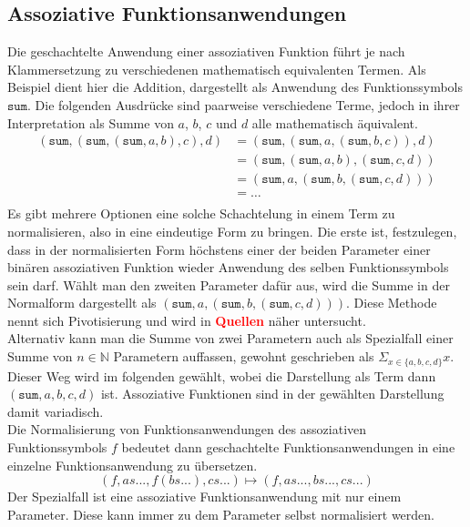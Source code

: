 \documentclass{scrartcl}
\numberwithin{figure}{section} %
\theoremstyle{definition} %
\begin{document}
\subsection {Assoziative Funktionsanwendungen}
Die geschachtelte Anwendung einer assoziativen Funktion führt je nach Klammersetzung zu verschiedenen mathematisch equivalenten Termen. Als Beispiel dient hier die Addition, dargestellt als Anwendung des Funktionssymbols $\texttt{sum}$. Die folgenden Ausdrücke sind paarweise verschiedene Terme, jedoch in ihrer Interpretation als Summe von $a$, $b$, $c$ und $d$ alle mathematisch äquivalent.
\begin{equation*}
	\begin{split}
	   (\texttt{sum}, (\texttt{sum}, (\texttt{sum}, a, b), c), d) 
    &= (\texttt{sum}, (\texttt{sum}, a, (\texttt{sum}, b, c)), d)\\
	&= (\texttt{sum}, (\texttt{sum}, a, b), (\texttt{sum}, c, d))\\
	&= (\texttt{sum}, a, (\texttt{sum}, b, (\texttt{sum}, c, d)))\\
	&= \dots \\
	\end{split}
\end{equation*}
Es gibt mehrere Optionen eine solche Schachtelung in einem Term zu normalisieren, also in eine eindeutige Form zu bringen. Die erste ist, festzulegen, dass in der normalisierten Form höchstens einer der beiden Parameter einer binären assoziativen Funktion wieder Anwendung des selben Funktionssymbols sein darf. Wählt man den zweiten Parameter dafür aus, wird die Summe in der Normalform dargestellt als $(\texttt{sum}, a, (\texttt{sum}, b, (\texttt{sum}, c, d)))$. Diese Methode nennt sich Pivotisierung und wird in \textcolor{red}{\textbf{Quellen}} näher untersucht.\\
Alternativ kann man die Summe von zwei Parametern auch als Spezialfall einer Summe von $n \in \mathbb{N}$ Parametern auffassen, gewohnt geschrieben als $\Sigma_{x \in \{a, b, c, d\}} x$. Dieser Weg wird im folgenden gewählt, wobei die Darstellung als Term dann $(\texttt{sum}, a, b, c, d)$ ist. Assoziative Funktionen sind in der gewählten Darstellung damit variadisch. \\
Die Normalisierung von Funktionsanwendungen des assoziativen Funktionssymbols $f$ bedeutet dann geschachtelte Funktionsanwendungen in eine einzelne Funktionsanwendung zu übersetzen. 
$$(f, as..., f(bs...), cs...) \mapsto (f, as..., bs..., cs...)$$
Der Spezialfall ist eine assoziative Funktionsanwendung mit nur einem Parameter. Diese kann immer zu dem Parameter selbst normalisiert werden. 
\end{document}
